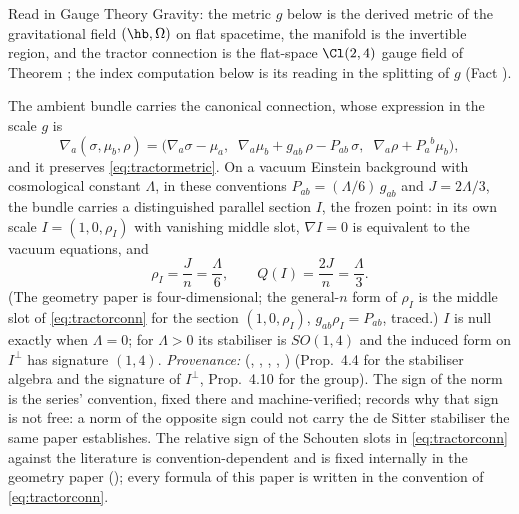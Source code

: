 Read in Gauge Theory Gravity: the metric $g$ below is the derived metric of the gravitational field $(\hb, \Omega)$ on flat spacetime, the manifold is the invertible region, and the tractor connection is the flat-space $\Cl(2,4)$ gauge field of Theorem ; the index computation below is its reading in the splitting of $g$ (Fact ).

The ambient bundle carries the canonical connection, whose expression in the scale $g$ is
\begin{equation}
\nabla_{a}(\sigma, \mu_{b}, \rho) = \bigl(\nabla_{a}\sigma - \mu_{a},\;\; \nabla_{a}\mu_{b} + g_{ab}\,\rho - P_{ab}\,\sigma,\;\; \nabla_{a}\rho + P_{a}{}^{b}\mu_{b}\bigr),
\end{equation}
and it preserves \eqref{eq:tractormetric}. On a vacuum Einstein background with cosmological constant $\Lambda$, in these conventions $P_{ab} = (\Lambda/6)\,g_{ab}$ and $J = 2\Lambda/3$, the bundle carries a distinguished parallel section $I$, the frozen point: in its own scale $I = (1, 0, \rho_{I})$ with vanishing middle slot, $\nabla I = 0$ is equivalent to the vacuum equations, and
\[
\rho_{I} = \frac{J}{n} = \frac{\Lambda}{6}, \qquad Q(I) = \frac{2J}{n} = \frac{\Lambda}{3}.
\]
(The geometry paper is four-dimensional; the general-$n$ form of $\rho_{I}$ is the middle slot of \eqref{eq:tractorconn} for the section $(1, 0, \rho_{I})$, $g_{ab}\rho_{I} = P_{ab}$, traced.) $I$ is null exactly when $\Lambda = 0$; for $\Lambda > 0$ its stabiliser is $SO(1,4)$ and the induced form on $I^{\perp}$ has signature $(1,4)$. \emph{Provenance:} \cite[Fact~4.1, Prop.~4.4, Thm.~4.5, Thm.~4.7, Prop.~4.10]{ButlerT6} (, , , , ) (Prop.~4.4 for the stabiliser algebra and the signature of $I^{\perp}$, Prop.~4.10 for the group). The sign of the norm is the series' convention, fixed there and machine-verified; \cite[Rem.~4.9]{ButlerT6} records why that sign is not free: a norm of the opposite sign could not carry the de Sitter stabiliser the same paper establishes. The relative sign of the Schouten slots in \eqref{eq:tractorconn} against the literature is convention-dependent and is fixed internally in the geometry paper \cite[Lem.~4.8]{ButlerT6} (); every formula of this paper is written in the convention of \eqref{eq:tractorconn}.
